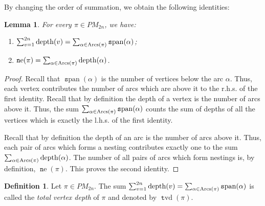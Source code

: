 \documentclass[11pt]{amsart}
\numberwithin{figure}{section}
\DeclareMathOperator{\depth}{depth}
\DeclareMathOperator{\arcs}{\text Arcs}
\DeclareMathOperator{\nst}{\mathtt ne}
\DeclareMathOperator{\aspan}{\mathtt span}
\DeclareMathOperator{\tvd}{\mathtt tvd}
\theoremstyle{plain}
\newtheorem{lemma}[theorem]{Lemma}
\theoremstyle{definition}
\newtheorem{definition}[theorem]{Definition}
\begin{document}
By changing the order of summation, we obtain the following identities:
\begin{lemma}\label{obs:depth_identity} For every $\pi\in PM_{2n}$, we have:
	\begin{enumerate}
	\item $\sum_{v=1}^{2n} \depth(v) = \sum_{\alpha \in \arcs(\pi)}\aspan(\alpha)$;
	\item $\nst(\pi) = \sum_{\alpha\in\arcs(\pi)} \depth(\alpha)$.
	\end{enumerate}
\end{lemma}
\begin{proof}
Recall that $\aspan(\alpha)$ is the number of vertices below the arc $\alpha$. Thus, each vertex contributes the number of arcs which are above it to the r.h.s. of the first identity. Recall that by definition the depth of a vertex is the number of arcs above it. Thus, the sum $\sum_{\alpha \in \arcs(\pi)}\aspan(\alpha)$ counts the sum of depths of all the vertices which is exactly the l.h.s. of the first identity.

Recall that by definition the depth of an arc is the number of arcs above it. Thus, each pair of arcs which forms a nesting contributes exactly one to the sum $\sum_{\alpha\in\arcs(\pi)} \depth(\alpha)$. The number of all pairs of arcs which form nestings is, by definition, $\nst(\pi)$. This proves the second identity.  
\end{proof}

\begin{definition}\label{definition:tvd}
	Let $\pi \in PM_{2n}$. The sum $\sum_{v=1}^{2n}\depth(v)=\sum_{\alpha\in\arcs(\pi)}\aspan(\alpha)$ is called the {\em total vertex depth} of $\pi$ and denoted by $\tvd(\pi)$.
\end{definition}
\end{document}
